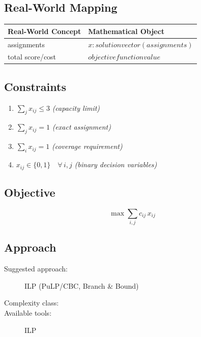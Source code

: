 \documentclass[11pt, a4paper]{article}
\begin{document}
\subsection{Real-World Mapping}

\begin{longtable}{ll}
\toprule
\textbf{Real-World Concept} & \textbf{Mathematical Object} \\
\midrule
\endhead
assignments & $x: solution vector (assignments)$ \\
total score/cost & $objective function value$ \\
\bottomrule
\end{longtable}

\subsection{Constraints}

\begin{enumerate}
  \item $\sum_j x_{ij} \le 3$
  \hfill \textit{(capacity limit)}
  \item $\sum_j x_{ij} = 1$
  \hfill \textit{(exact assignment)}
  \item $\sum_i x_{ij} = 1$
  \hfill \textit{(coverage requirement)}
  \item $x_{ij} \in \{0, 1\} \quad \forall\, i, j$
  \hfill \textit{(binary decision variables)}
\end{enumerate}

\subsection{Objective}

\begin{equation}
\max \sum_{i,j} c_{ij} \, x_{ij}
\end{equation}

\subsection{Approach}

\begin{description}
  \item[Suggested approach:] ILP (PuLP/CBC, Branch \& Bound)
  \item[Complexity class:] 
  \item[Available tools:] ILP
\end{description}
\end{document}
